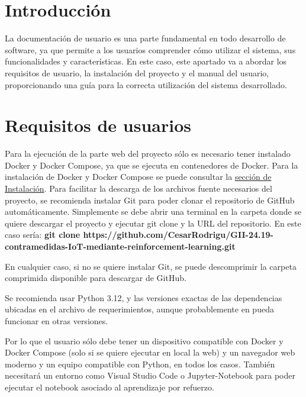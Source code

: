 
\section{Introducción}
La documentación de usuario es una parte fundamental en todo desarrollo de software, ya que permite a los usuarios comprender cómo utilizar el sistema, sus funcionalidades y características. En este caso, este apartado va a abordar los requisitos de usuario, la instalación del proyecto y el manual del usuario, proporcionando una guía para la correcta utilización del sistema desarrollado.

\section{Requisitos de usuarios}
\label{sec:requisitos-usuarios}

Para la ejecución de la parte web del proyecto sólo es necesario tener instalado Docker y Docker Compose, ya que se ejecuta en contenedores de Docker. Para la instalación de Docker y Docker Compose se puede consultar la \hyperref[sec:instalacion]{sección de Instalación}.
Para facilitar la descarga de los archivos fuente necesarios del proyecto, se recomienda instalar Git para poder clonar el repositorio de GitHub automáticamente. Simplemente se debe abrir una terminal en la carpeta donde se quiere descargar el proyecto y ejecutar git clone y la URL del repositorio. En este caso sería: \textbf{git clone https://github.com/CesarRodrigu/GII-24.19-contramedidas-IoT-mediante-reinforcement-learning.git}

En cualquier caso, si no se quiere instalar Git, se puede descomprimir la carpeta comprimida disponible para descargar de GitHub.



Se recomienda usar Python 3.12, y las versiones exactas de las dependencias ubicadas en el archivo de requerimientos, aunque probablemente en pueda funcionar en otras versiones.

Por lo que el usuario sólo debe tener un dispositivo compatible con Docker y Docker Compose (solo si se quiere ejecutar en local la web) y un navegador web moderno y un equipo compatible con Python, en todos los casos. También necesitará un entorno como Visual Studio Code o Jupyter-Notebook para poder ejecutar el notebook asociado al aprendizaje por refuerzo.


